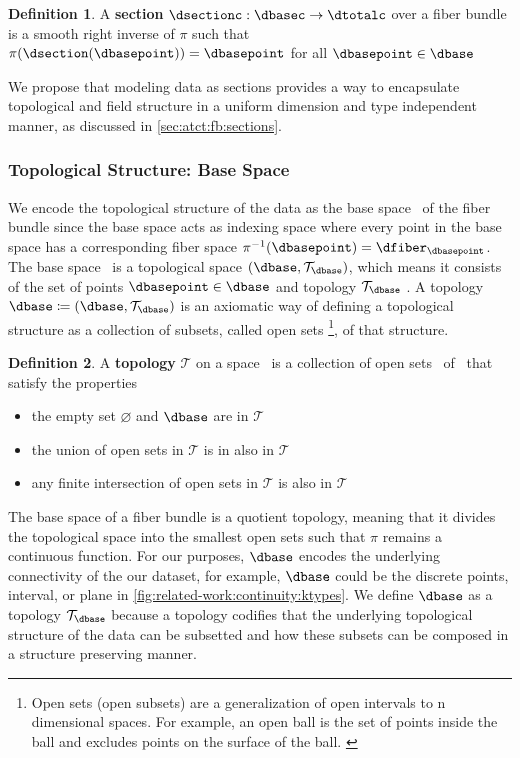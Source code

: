 \documentclass[10pt,journal,compsoc]{IEEEtran}
\theoremstyle{definition}
\newtheorem{definition}{Definition}[section]
\theoremstyle{remark}
\begin{document}
\begin{definition} A \textcolor{section}{\textbf{section}} $\dsectionc: \dbasec \rightarrow \dtotalc$ over a fiber bundle is a smooth right inverse of $\pi$ such that $\pi(\dsection(\dbasepoint)) = \dbasepoint$ for all $\dbasepoint \in \dbase$
\end{definition}
We propose that modeling data as sections provides a way to encapsulate topological and field structure in a uniform dimension and type independent manner, as discussed in \autoref{sec:atct:fb:sections}.

\subsubsection{Topological Structure: Base Space \dbase}
\label{sec:atct:fb:base}
We encode the topological structure of the data as the \textcolor{base}{base space} \dbase\ of the fiber bundle since the base space acts as indexing space where every point in the base space has a corresponding fiber space $\pi^{-1}(\dbasepoint) = \dfiber_{\dbasepoint}$. The \textcolor{base}{base space} \dbasec\ is a topological space $(\dbase,\mathcal{T}_{\dbase})$, which means it  consists of the set of points ${\dbasepoint \in \dbase}$ and topology $\mathcal{T}_{\dbase}$ \cite{munkresElementsAlgebraicTopology1984}. A topology $\dbase \coloneqq (\dbase,\mathcal{T}_{\dbase})$ is an axiomatic way of defining a topological structure\cite{bradleyTopologyCategoricalApproach2020}  as a collection of subsets, called open sets \footnote{Open sets (open subsets) are a generalization of open intervals to n dimensional spaces. For example, an open ball is the set of points inside the ball and excludes points on the surface of the ball. \cite{weissteinOpenSet}}, of that structure. 

\begin{definition}
A \textbf{topology} $\mathcal{T}$ on a space \dbase\ is a collection of open sets \openset\ of \dbase\ that satisfy the properties 
  \begin{itemize}
    \item the empty set $\varnothing$ and $\dbase$ are in $\mathcal{T}$
    \item the union of open sets in $\mathcal{T}$ is in also in $\mathcal{T}$
    \item any finite intersection of open sets in $\mathcal{T}$ is also in $\mathscr{T}$
  \end{itemize}
\end{definition}
The base space of a fiber bundle is a quotient topology\cite{QuotientSpaceTopology2020}, meaning that it divides the topological space into the smallest open sets such that $\pi$ remains a continuous function.  For our purposes, $\dbase$ encodes the underlying connectivity of the our dataset, for example, $\dbase$ could be the discrete points, interval, or plane in \autoref{fig:related-work:continuity:ktypes}. We define $\dbase$ as a topology $\mathcal{T}_{\dbase}$ because a topology codifies that the underlying topological structure of the data can be subsetted and how these subsets can be composed in a structure preserving manner. 
\end{document}
